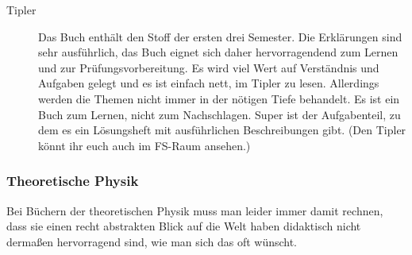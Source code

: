 \begin{description}

\item[Tipler]{
Das Buch enthält den Stoff der ersten drei Semester. Die Erklärungen
sind
sehr ausführlich, das Buch eignet sich daher hervorragendend zum
Lernen und
zur Prüfungsvorbereitung. Es wird viel Wert auf Verständnis und
Aufgaben
gelegt und es ist einfach nett, im Tipler zu lesen. Allerdings werden
die
Themen nicht immer in der nötigen Tiefe behandelt. Es ist ein
Buch zum Lernen, nicht zum Nachschlagen. Super ist der Aufgabenteil,
zu dem es
ein Lösungsheft mit ausführlichen Beschreibungen gibt. (Den Tipler
könnt ihr euch auch
im FS-Raum ansehen.)}

\end{description}

\subsubsection*{Theoretische Physik}

Bei Büchern der theoretischen Physik muss man leider immer damit rechnen,
dass sie einen recht abstrakten Blick auf die Welt haben didaktisch nicht
dermaßen hervorragend sind, wie man sich das oft wünscht. 

